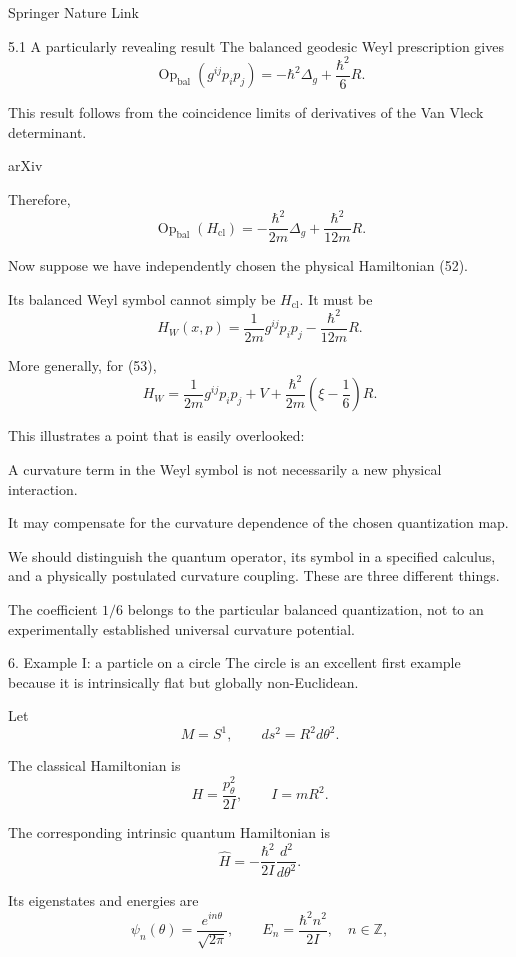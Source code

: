 Springer Nature Link



5.1 A particularly revealing result
The balanced geodesic Weyl prescription gives
\[
\boxed{
\operatorname{Op}_{\mathrm{bal}}
\left(g^{ij}p_ip_j\right)
=
-\hbar^2\Delta_g+\frac{\hbar^2}{6}R.
}
\tag{54}
\]

This result follows from the coincidence limits of derivatives of the Van Vleck determinant. 

arXiv




Therefore,
\[
\operatorname{Op}_{\mathrm{bal}}(H_{\mathrm{cl}})
=
-\frac{\hbar^2}{2m}\Delta_g
+\frac{\hbar^2}{12m}R.
\tag{55}
\]

Now suppose we have independently chosen the physical Hamiltonian (52).

Its balanced Weyl symbol cannot simply be \(H_{\mathrm{cl}}\). It must be
\[
\boxed{
H_W(x,p)=
\frac1{2m}g^{ij}p_ip_j
-\frac{\hbar^2}{12m}R.
}
\tag{56}
\]

More generally, for (53),
\[
\boxed{
H_W=
\frac1{2m}g^{ij}p_ip_j
+V+
\frac{\hbar^2}{2m}
\left(\xi-\frac16\right)R.
}
\tag{57}
\]

This illustrates a point that is easily overlooked:

A curvature term in the Weyl symbol is not necessarily a new physical interaction.

It may compensate for the curvature dependence of the chosen quantization map.

We should distinguish the quantum operator, its symbol in a specified calculus, and a physically postulated curvature coupling. These are three different things.

The coefficient \(1/6\) belongs to the particular balanced quantization, not to an experimentally established universal curvature potential.

6. Example I: a particle on a circle
The circle is an excellent first example because it is intrinsically flat but globally non-Euclidean.

Let
\[
M=S^1,\qquad ds^2=R^2d\theta^2.
\]

The classical Hamiltonian is
\[
H=\frac{p_\theta^2}{2I},
\qquad I=mR^2.
\tag{58}
\]

The corresponding intrinsic quantum Hamiltonian is
\[
\widehat H=
-\frac{\hbar^2}{2I}\frac{d^2}{d\theta^2}.
\tag{59}
\]

Its eigenstates and energies are
\[
\psi_n(\theta)=\frac{e^{in\theta}}{\sqrt{2\pi}},
\qquad
E_n=\frac{\hbar^2n^2}{2I},
\quad n\in\mathbb Z,
\tag{60}
\]

